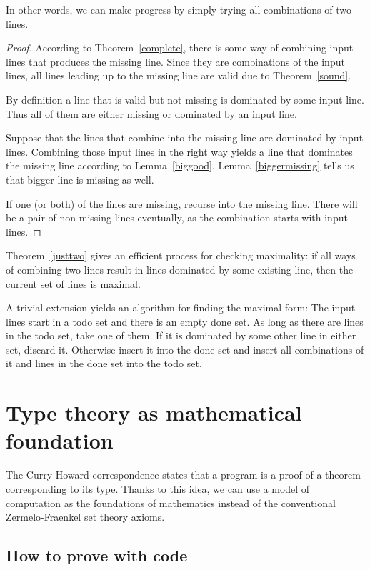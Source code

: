 \documentclass[english, 12pt, a4paper, sci, a-1b, online]{aaltothesis}
\begin{document}
In other words, we can make progress by simply trying all combinations of two lines.

\begin{proof}
According to Theorem~\ref{complete}, there is some way of combining input lines that produces the missing line. Since they are combinations of the input lines, all lines leading up to the missing line are valid due to Theorem~\ref{sound}.

By definition a line that is valid but not missing is dominated by some input line. Thus all of them are either missing or dominated by an input line.

Suppose that the lines that combine into the missing line are dominated by input lines. Combining those input lines in the right way yields a line that dominates the missing line according to Lemma~\ref{biggood}. Lemma~\ref{biggermissing} tells us that bigger line is missing as well.

If one (or both) of the lines are missing, recurse into the missing line. There will be a pair of non-missing lines eventually, as the combination starts with input lines.
\end{proof}

Theorem~\ref{justtwo} gives an efficient process for checking maximality: if all ways of combining two lines result in lines dominated by some existing line, then the current set of lines is maximal.

A trivial extension yields an algorithm for finding the maximal form: The input lines start in a todo set and there is an empty done set. As long as there are lines in the todo set, take one of them. If it is dominated by some other line in either set, discard it. Otherwise insert it into the done set and insert all combinations of it and lines in the done set into the todo set.


\section{Type theory as mathematical foundation}\label{dependent}

The Curry-Howard correspondence states that a program is a proof of a theorem corresponding to its type. Thanks to this idea, we can use a model of computation as the foundations of mathematics instead of the conventional Zermelo-Fraenkel set theory axioms.

\subsection{How to prove with code}
\end{document}
